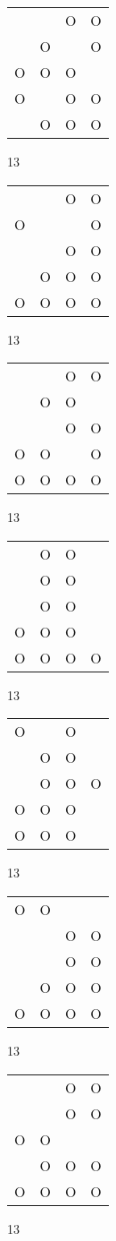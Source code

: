 \begin{tabular}{|m{0.2cm}m{0.2cm}m{0.2cm}m{0.2cm}|}\hline
 & &O&O\\
 &O& &O\\
O&O&O& \\
O& &O&O\\
 &O&O&O\\
\hline\end{tabular}13
\begin{tabular}{|m{0.2cm}m{0.2cm}m{0.2cm}m{0.2cm}|}\hline
 & &O&O\\
O& & &O\\
 & &O&O\\
 &O&O&O\\
O&O&O&O\\
\hline\end{tabular}13
\begin{tabular}{|m{0.2cm}m{0.2cm}m{0.2cm}m{0.2cm}|}\hline
 & &O&O\\
 &O&O& \\
 & &O&O\\
O&O& &O\\
O&O&O&O\\
\hline\end{tabular}13
\begin{tabular}{|m{0.2cm}m{0.2cm}m{0.2cm}m{0.2cm}|}\hline
 &O&O& \\
 &O&O& \\
 &O&O& \\
O&O&O& \\
O&O&O&O\\
\hline\end{tabular}13
\begin{tabular}{|m{0.2cm}m{0.2cm}m{0.2cm}m{0.2cm}|}\hline
O& &O& \\
 &O&O& \\
 &O&O&O\\
O&O&O& \\
O&O&O& \\
\hline\end{tabular}13
\begin{tabular}{|m{0.2cm}m{0.2cm}m{0.2cm}m{0.2cm}|}\hline
O&O& & \\
 & &O&O\\
 & &O&O\\
 &O&O&O\\
O&O&O&O\\
\hline\end{tabular}13
\begin{tabular}{|m{0.2cm}m{0.2cm}m{0.2cm}m{0.2cm}|}\hline
 & &O&O\\
 & &O&O\\
O&O& & \\
 &O&O&O\\
O&O&O&O\\
\hline\end{tabular}13
